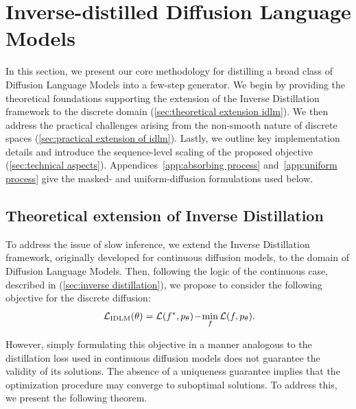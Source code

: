 \vspace{-2mm}
\section{Inverse-distilled Diffusion Language Models}
\vspace{-2mm}
\label{sec:idlm}
    In this section, we present our core methodology for distilling a broad class of Diffusion Language Models into a few-step generator. We begin by providing the theoretical foundations supporting the extension of the Inverse Distillation framework to the discrete domain (\wasyparagraph\ref{sec:theoretical extension idlm}). We then address the practical challenges arising from the non-smooth nature of discrete spaces (\wasyparagraph\ref{sec:practical extension of idlm}). Lastly, we outline key implementation details \textcolor{debugcolor}{and introduce the sequence-level scaling of the proposed objective} (\wasyparagraph\ref{sec:technical aspects}). Appendices~\ref{app:absorbing process} and~\ref{app:uniform process} give the masked- and uniform-diffusion formulations used below.

\vspace{-1mm}
\subsection{Theoretical extension of Inverse Distillation}
\vspace{-1mm}
\label{sec:theoretical extension idlm}

    To address the issue of slow inference, we extend the Inverse Distillation framework, originally developed for continuous diffusion models, to the domain of Diffusion Language Models. Then, following the logic of the continuous case, described in (\wasyparagraph\ref{sec:inverse distillation}), we propose to consider the following objective for the discrete diffusion:
    \begin{equation}
    \label{eq:inverse discrete diffusion distillation}
        \mathcal{L}_{\text{IDLM}} (\theta ) = \mathcal{L}(f^*, p_{\theta}) \!
        - \! \min_{f} \mathcal{L}(f, p_{\theta}).\!
    \end{equation}

    However, simply formulating this objective in a manner analogous to the distillation loss used in continuous diffusion models does not guarantee the validity of its solutions. The absence of a uniqueness guarantee implies that the optimization procedure may converge to suboptimal solutions. To address this, we present the following theorem. 
    
